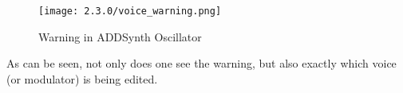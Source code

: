 \begin{figure}[H]
   \centering
   \texttt{[image: 2.3.0/voice\_warning.png]}
   \caption{Warning in ADDSynth Oscillator}
   \label{fig:voice_oscillator_warning}
\end{figure}

   As can be seen, not only does one see the warning, but also exactly which
   voice (or modulator) is being edited.

